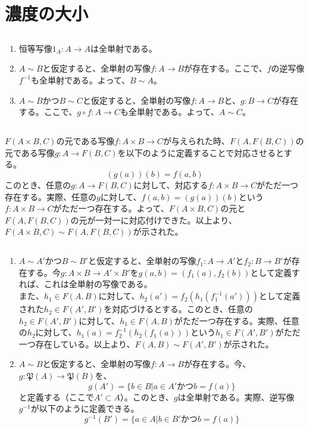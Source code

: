 \documentclass{jsarticle}
\begin{document}
\section{濃度の大小}
\subsection{}
\begin{enumerate}
\item
恒等写像$1_{A}:A\to A$は全単射である。
\item
$A\sim B$と仮定すると、全単射の写像$f:A\to B$が存在する。ここで、$f$の逆写像$f^{-1}$も全単射である。よって、$B\sim A$。
\item
$A\sim B$かつ$B\sim C$と仮定すると、全単射の写像$f:A\to B$と、$g:B\to C$が存在する。ここで、$g\circ f:A\to C$も全単射である。よって、$A\sim C$。
\end{enumerate}

\subsection{}
$F(A\times B, C)$の元である写像$f:A\times B\to C$が与えられた時、$F(A,F(B,C))$の元である写像$g:A\to F(B,C)$を以下のように定義することで対応させるとする。
\[(g(a))(b)=f(a,b)\]
このとき、任意の$g:A\to F(B,C)$に対して、対応する$f:A\times B\to C$がただ一つ存在する。実際、任意の$g$に対して、$f(a,b)=(g(a))(b)$という$f:A\times B\to C$がただ一つ存在する。よって、$F(A\times B, C)$の元と$F(A,F(B,C))$の元が一対一に対応付けできた。以上より、$F(A\times B, C)\sim F(A,F(B,C))$が示された。

\subsection{}
\begin{enumerate}
\item
$A\sim A'$かつ$B\sim B'$と仮定すると、全単射の写像$f_1:A\to A'$と$f_2:B\to B'$が存在する。今$g:A\times B \to A'\times B'$を$g(a,b)=(f_1(a),f_2(b))$として定義すれば、これは全単射の写像である。\\
また、$h_1\in F(A,B)$に対して、$h_2(a')=f_2(h_1(f_1^{-1}(a')))$として定義された$h_2 \in F(A',B')$を対応づけるとする。このとき、任意の$h_2 \in F(A',B')$に対して、$h_1\in F(A,B)$がただ一つ存在する。実際、任意の$h_2$に対して、$h_1(a)=f_2^{-1}(h_2(f_1(a)))$という$h_1\in F(A',B')$がただ一つ存在している。以上より、$F(A,B)\sim F(A',B')$が示された。
\item
$A\sim B$と仮定すると、全単射の写像$f:A\to B$が存在する。今、$g:\mathfrak{P}(A)\to\mathfrak{P}(B)$を、\[g(A')=\{b\in B|a\in A' かつ b=f(a)\}\]と定義する（ここで$A'\subset A$）。このとき、$g$は全単射である。実際、逆写像$g^{-1}$が以下のように定義できる。
\[g^{-1}(B')=\{a\in A|b\in B' かつ b=f(a)\}\]
\end{enumerate}
\end{document}
